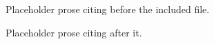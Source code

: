 \documentclass{article}
\begin{document}
Placeholder prose citing \citep{roe2020} before the included file.


Placeholder prose citing \citet{vale2016} after it.



\end{document}
